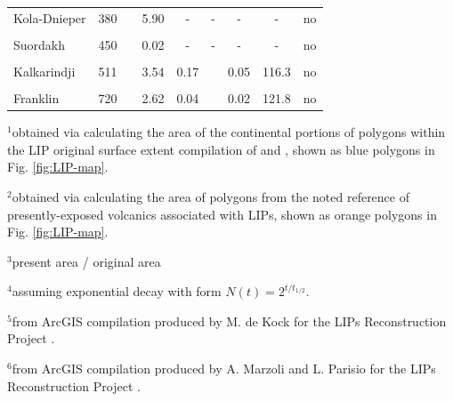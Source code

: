 \begin{table}[!htbp]
{\begin{tabular}{lc>{\raggedright}p{4cm}cc>{\raggedright}p{4cm}ccl}
Kola-Dnieper & 380 & \citet{Arzamastsev2014a} & 5.90 & - & - & - & - & no \\
 & & & & & & & & \\
Suordakh & 450 & \citet{Khudoley2013a} & 0.02 & - & - & - & - & no \\
 & & & & & & & & \\
Kalkarindji & 511 & \citet{Jourdan2014a} & 3.54 & 0.17 & \citet{Thorne2014a} & 0.05 & 116.3 & no \\
 & & & & & & & & \\
Franklin & 720 & \citet{Denyszyn2009a} & 2.62 & 0.04 & \citet{Buchan2004a} & 0.02 & 121.8 & no \\
\bottomrule
\end{tabular}
}
\begin{tablenotes}
\vspace{0.15cm}
$^{1}$obtained via calculating the area of the continental portions of polygons within the LIP original surface extent compilation of \citet{Ernst2017a} and \citet{Ernst2019a}, shown as blue polygons in Fig. \ref{fig:LIP-map}.
\vspace{0.15cm}

$^{2}$obtained via calculating the area of polygons from the noted reference of presently-exposed volcanics associated with LIPs, shown as orange polygons in Fig. \ref{fig:LIP-map}.
\vspace{0.15cm}

$^{3}$present area / original area
\vspace{0.15cm}

$^{4}$assuming exponential decay with form $N(t) = 2^{t/t_{1/2}}$.
\vspace{0.15cm}

$^{5}$from ArcGIS compilation produced by M. de Kock for the LIPs Reconstruction Project \citep{Ernst2013a}.
\vspace{0.15cm}

$^{6}$from ArcGIS compilation produced by A. Marzoli and L. Parisio for the LIPs Reconstruction Project \citep{Ernst2013a}.
\end{tablenotes}
\label{tab:LIPs}
\end{table}

